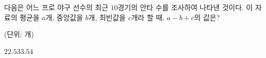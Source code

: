 다음은 어느 프로 야구 선수의 최근 $10$경기의 안타 수를 조사하여 나타낸 것이다. 이 자료의 평균을 $a$개, 중앙값을 $b$개, 최빈값을 $c$개라 할 때, $a-b+c$의 값은?\par\noindent\hfill{\footnotesize (단위: 개)}
\begin{choices32}{$2$}{$2.5$}{$3$}{$3.5$}{$4$}\end{choices32}
